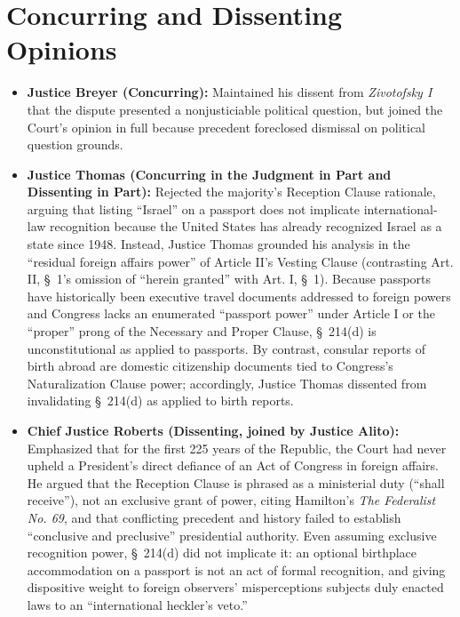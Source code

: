 \documentclass[12pt]{article}
\begin{document}
\section{Concurring and Dissenting Opinions}
\begin{itemize}
  \item \textbf{Justice Breyer (Concurring):} Maintained his dissent from \textit{Zivotofsky I} that the dispute presented a nonjusticiable political question, but joined the Court's opinion in full because precedent foreclosed dismissal on political question grounds.
  \item \textbf{Justice Thomas (Concurring in the Judgment in Part and Dissenting in Part):} Rejected the majority's Reception Clause rationale, arguing that listing ``Israel'' on a passport does not implicate international-law recognition because the United States has already recognized Israel as a state since 1948. Instead, Justice Thomas grounded his analysis in the ``residual foreign affairs power'' of Article II's Vesting Clause (contrasting Art. II, \S~1's omission of ``herein granted'' with Art. I, \S~1). Because passports have historically been executive travel documents addressed to foreign powers and Congress lacks an enumerated ``passport power'' under Article I or the ``proper'' prong of the Necessary and Proper Clause, \S~214(d) is unconstitutional as applied to passports. By contrast, consular reports of birth abroad are domestic citizenship documents tied to Congress's Naturalization Clause power; accordingly, Justice Thomas dissented from invalidating \S~214(d) as applied to birth reports.
  \item \textbf{Chief Justice Roberts (Dissenting, joined by Justice Alito):} Emphasized that for the first 225 years of the Republic, the Court had never upheld a President's direct defiance of an Act of Congress in foreign affairs. He argued that the Reception Clause is phrased as a ministerial duty (``shall receive''), not an exclusive grant of power, citing Hamilton's \textit{The Federalist No. 69}, and that conflicting precedent and history failed to establish ``conclusive and preclusive'' presidential authority. Even assuming exclusive recognition power, \S~214(d) did not implicate it: an optional birthplace accommodation on a passport is not an act of formal recognition, and giving dispositive weight to foreign observers' misperceptions subjects duly enacted laws to an ``international heckler's veto.''

\end{itemize}
\end{document}
